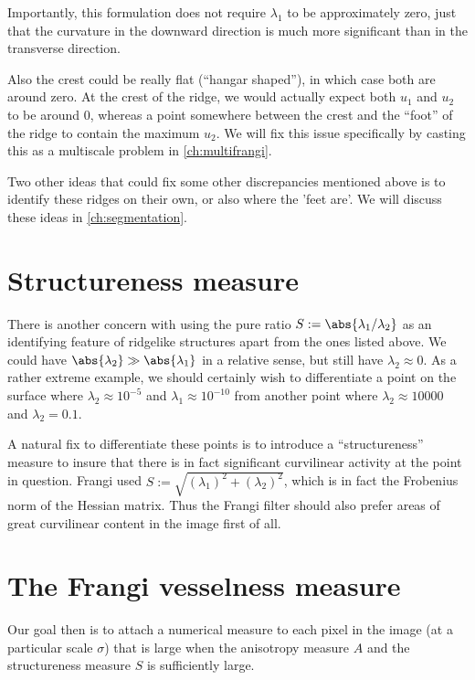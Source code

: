 Importantly, this formulation does not require $\lambda_1$ to be approximately zero, just that the curvature in the downward direction is much more significant than in the transverse direction.

Also the crest could be really flat (``hangar shaped''), in which case both are around zero. At the crest of the ridge, we would actually expect both $u_1$ and $u_2$ to be around 0, whereas a point somewhere between the crest and the ``foot'' of the ridge to contain the maximum $u_2$. We will fix this issue specifically by casting this as a multiscale problem in \cref{ch:multifrangi}.

Two other ideas that could fix some other discrepancies mentioned above is to identify these ridges on their own, or also where the 'feet are'. We will discuss these ideas in \cref{ch:segmentation}.

\section{Structureness measure} \label{sec:frangi-structureness}

There is another concern with using the pure ratio $S:= \abs{\lambda_1 / \lambda_2}$ as an identifying feature of ridgelike structures apart from the ones listed above. We could have $\abs{\lambda_2} \gg \abs{\lambda_1}$ in a relative sense, but still have $\lambda_2 \approx 0$. As a rather extreme example, we should certainly wish to differentiate a point on the surface where $\lambda_2 \approx 10^{-5} $ and $\lambda_1 \approx 10^{-10}$ from another point where $\lambda_2 \approx 10000$ and $\lambda_2 = 0.1$.

A natural fix to differentiate these points is to introduce a ``structureness'' measure to insure that there is in fact significant curvilinear activity at the point in question. Frangi used $S:= \sqrt{(\lambda_1)^2 + (\lambda_2)^2}$, which is in fact the Frobenius norm of the Hessian matrix. Thus the Frangi filter should also prefer areas of
great curvilinear content in the image first of all.


\section{The Frangi vesselness measure}

Our goal then is to attach a numerical measure to each pixel in the image (at a particular scale $\sigma$) that is large when the anisotropy measure $A$ and the structureness measure $S$ is sufficiently large.


